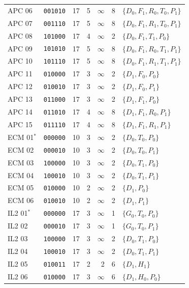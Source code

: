 \begin{longtable}{@{}lcrrrrl@{}}
APC 06 & \texttt{001010} & 17 & 5 & $\infty$ & 8 & $\{D_{0},F_{1},R_{0},T_{0},P_{1}\}$\\
APC 07 & \texttt{001110} & 17 & 5 & $\infty$ & 8 & $\{D_{0},F_{1},R_{1},T_{0},P_{1}\}$\\
APC 08 & \texttt{101000} & 17 & 4 & $\infty$ & 2 & $\{D_{0},F_{1},T_{1},P_{0}\}$\\
APC 09 & \texttt{101010} & 17 & 5 & $\infty$ & 8 & $\{D_{0},F_{1},R_{0},T_{1},P_{1}\}$\\
APC 10 & \texttt{101110} & 17 & 5 & $\infty$ & 8 & $\{D_{0},F_{1},R_{1},T_{1},P_{1}\}$\\
APC 11 & \texttt{010000} & 17 & 3 & $\infty$ & 2 & $\{D_{1},F_{0},P_{0}\}$\\
APC 12 & \texttt{010010} & 17 & 3 & $\infty$ & 2 & $\{D_{1},F_{0},P_{1}\}$\\
APC 13 & \texttt{011000} & 17 & 3 & $\infty$ & 2 & $\{D_{1},F_{1},P_{0}\}$\\
APC 14 & \texttt{011010} & 17 & 4 & $\infty$ & 8 & $\{D_{1},F_{1},R_{0},P_{1}\}$\\
APC 15 & \texttt{011110} & 17 & 4 & $\infty$ & 8 & $\{D_{1},F_{1},R_{1},P_{1}\}$\\
ECM 01$^*$ & \texttt{000000} & 10 & 3 & $\infty$ & 2 & $\{D_{0},T_{0},P_{0}\}$\\
ECM 02 & \texttt{000010} & 10 & 3 & $\infty$ & 2 & $\{D_{0},T_{0},P_{1}\}$\\
ECM 03 & \texttt{100000} & 10 & 3 & $\infty$ & 2 & $\{D_{0},T_{1},P_{0}\}$\\
ECM 04 & \texttt{100010} & 10 & 3 & $\infty$ & 2 & $\{D_{0},T_{1},P_{1}\}$\\
ECM 05 & \texttt{010000} & 10 & 2 & $\infty$ & 2 & $\{D_{1},P_{0}\}$\\
ECM 06 & \texttt{010010} & 10 & 2 & $\infty$ & 2 & $\{D_{1},P_{1}\}$\\
IL2 01$^*$ & \texttt{000000} & 17 & 3 & $\infty$ & 1 & $\{G_{0},T_{0},P_{0}\}$\\
IL2 02 & \texttt{000010} & 17 & 3 & $\infty$ & 1 & $\{G_{0},T_{0},P_{1}\}$\\
IL2 03 & \texttt{100000} & 17 & 3 & $\infty$ & 2 & $\{D_{0},T_{1},P_{0}\}$\\
IL2 04 & \texttt{100010} & 17 & 3 & $\infty$ & 2 & $\{D_{0},T_{1},P_{1}\}$\\
IL2 05 & \texttt{010011} & 17 & 2 & 2 & 6 & $\{D_{1},H_{1}\}$\\
IL2 06 & \texttt{010000} & 17 & 3 & $\infty$ & 6 & $\{D_{1},H_{0},P_{0}\}$\\

\end{longtable}
